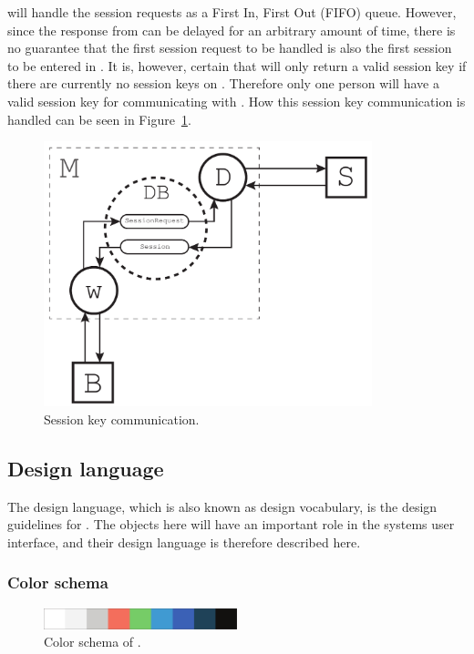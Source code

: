  will handle the session requests as a First In, First Out (FIFO) queue.
However, since the response from  can be delayed for an arbitrary amount of time, there is no guarantee that the first session request to be handled is also the first session to be entered in .
It is, however, certain that  will only return a valid session key if there are currently no session keys on .
Therefore only one person will have a valid session key for communicating with .
How this session key communication is handled can be seen in Figure~\ref{fig:sessionkey_communication}.

\begin{figure}[htb]
    \centering
    \includegraphics[width=0.85\textwidth]{gfx/sessionkey_communication_b.pdf}
    \caption{Session key communication.}
    \label{fig:sessionkey_communication}
\end{figure}

\subsection{Design language}
The design language, which is also known as design vocabulary, is the design guidelines for \projectname{}.
The objects here will have an important role in the systems user interface, and their design language is therefore described here.

\subsubsection{Color schema}
\begin{figure}[htb]
    \centering
    \includegraphics[width=0.5\textwidth]{gfx/color_schema.pdf}
    \caption{Color schema of \projectname{}.}
    \label{fig:color_schema}
\end{figure}


